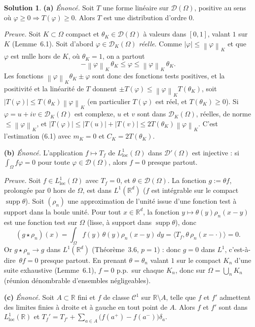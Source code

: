 \documentclass[11pt,a4paper]{article}
\newcommand{\R}{\mathbb{R}}
\newcommand{\norm}[1]{\left\|#1\right\|}
\newcommand{\ie}{c'est-à-dire}
\DeclareMathOperator{\supp}{supp}
\newcommand{\D}{\mathcal{D}}
\theoremstyle{definition}
\newtheorem*{solution}{Solution}
\begin{document}
\begin{solution}
\noindent\textbf{(a)} \emph{Énoncé.} Soit $T$ une forme linéaire sur $\D(\Omega)$, positive au sens où $\varphi\ge0\Rightarrow T(\varphi)\ge0$. Alors $T$ est une distribution d'ordre $0$.

\emph{Preuve.} Soit $K\subset\Omega$ compact et $\theta_K\in\D(\Omega)$ à valeurs dans $[0,1]$, valant $1$ sur $K$ (Lemme~6.1). Soit d'abord $\varphi\in\D_K(\Omega)$ \emph{réelle}. Comme $|\varphi|\le\norm\varphi_K$ et que $\varphi$ est nulle hors de $K$, où $\theta_K=1$, on a partout
\[
-\norm\varphi_K\,\theta_K\le\varphi\le\norm\varphi_K\,\theta_K .
\]
Les fonctions $\norm\varphi_K\theta_K\pm\varphi$ sont donc des fonctions tests positives, et la positivité et la linéarité de $T$ donnent $\pm T(\varphi)\le\norm\varphi_KT(\theta_K)$, soit $|T(\varphi)|\le T(\theta_K)\norm\varphi_K$ (en particulier $T(\varphi)$ est réel, et $T(\theta_K)\ge0$). Si $\varphi=u+iv\in\D_K(\Omega)$ est complexe, $u$ et $v$ sont dans $\D_K(\Omega)$, réelles, de norme $\le\norm\varphi_K$, et $|T(\varphi)|\le|T(u)|+|T(v)|\le2T(\theta_K)\norm\varphi_K$. C'est l'estimation (6.1) avec $m_K=0$ et $C_K=2T(\theta_K)$.

\medskip
\noindent\textbf{(b)} \emph{Énoncé.} L'application $f\mapsto T_f$ de $L^1_{\mathrm{loc}}(\Omega)$ dans $\D'(\Omega)$ est injective : si $\int_\Omega f\varphi=0$ pour toute $\varphi\in\D(\Omega)$, alors $f=0$ presque partout.

\emph{Preuve.} Soit $f\in L^1_{\mathrm{loc}}(\Omega)$ avec $T_f=0$, et $\theta\in\D(\Omega)$. La fonction $g:=\theta f$, prolongée par $0$ hors de $\Omega$, est dans $L^1(\R^d)$ ($f$ est intégrable sur le compact $\supp\theta$). Soit $(\rho_n)$ une approximation de l'unité issue d'une fonction test à support dans la boule unité. Pour tout $x\in\R^d$, la fonction $y\mapsto\theta(y)\rho_n(x-y)$ est une fonction test sur $\Omega$ (lisse, à support dans $\supp\theta$), donc
\[
(g\star\rho_n)(x)=\int_\Omega f(y)\,\theta(y)\rho_n(x-y)\,dy=\big\langle T_f,\theta\,\rho_n(x-\cdot)\big\rangle=0 .
\]
Or $g\star\rho_n\to g$ dans $L^1(\R^d)$ (Théorème~3.6, $p=1$) : donc $g=0$ dans $L^1$, \ie\ $\theta f=0$ presque partout. En prenant $\theta=\theta_n$ valant $1$ sur le compact $K_n$ d'une suite exhaustive (Lemme~6.1), $f=0$ p.p.\ sur chaque $K_n$, donc sur $\Omega=\bigcup_nK_n$ (réunion dénombrable d'ensembles négligeables).

\medskip
\noindent\textbf{(c)} \emph{Énoncé.} Soit $A\subset\R$ fini et $f$ de classe $\mathcal C^1$ sur $\R\setminus A$, telle que $f$ et $f'$ admettent des limites finies à droite et à gauche en tout point de $A$. Alors $f$ et $f'$ sont dans $L^1_{\mathrm{loc}}(\R)$ et $T_f'=T_{f'}+\sum_{a\in A}\big(f(a^+)-f(a^-)\big)\delta_a$.


\end{solution}
\end{document}
